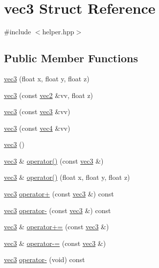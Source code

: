 \hypertarget{structvec3}{\section{vec3 Struct Reference}
\label{structvec3}
}


{\ttfamily \#include $<$helper.\+hpp$>$}

\subsection*{Public Member Functions}
\begin{DoxyCompactItemize}
\item 
\hyperlink{structvec3_a0c11a1f6ed4c349713657dd3452d6ea3}{vec3} (float x, float y, float z)
\item 
\hyperlink{structvec3_a0be4c6cdf0d0075143c7f002afbd9197}{vec3} (const \hyperlink{structvec2}{vec2} \&vv, float z)
\item 
\hyperlink{structvec3_ad4c53c507779713af6bc2f47d60b458e}{vec3} (const \hyperlink{structvec3}{vec3} \&vv)
\item 
\hyperlink{structvec3_ae8b2e6ef16b18f03756310a5ef9eb558}{vec3} (const \hyperlink{structvec4}{vec4} \&vv)
\item 
\hyperlink{structvec3_aea9f3480a6ccd7ce3ab02d0992705d33}{vec3} ()
\item 
\hyperlink{structvec3}{vec3} \& \hyperlink{structvec3_ae5c4f205385ed5c1497343ca91f34874}{operator()} (const \hyperlink{structvec3}{vec3} \&)
\item 
\hyperlink{structvec3}{vec3} \& \hyperlink{structvec3_adcc8c74d2a6bec1f2f8ce16779b511e1}{operator()} (float x, float y, float z)
\item 
\hyperlink{structvec3}{vec3} \hyperlink{structvec3_a3d8a20b779705b215e7cdcba780c8e70}{operator+} (const \hyperlink{structvec3}{vec3} \&) const 
\item 
\hyperlink{structvec3}{vec3} \hyperlink{structvec3_a3bd4baa92fdd2e08e0852eb1bbc80e58}{operator-\/} (const \hyperlink{structvec3}{vec3} \&) const 
\item 
\hyperlink{structvec3}{vec3} \& \hyperlink{structvec3_a35d8a4bfa8ea867ad4810674de7b43a4}{operator+=} (const \hyperlink{structvec3}{vec3} \&)
\item 
\hyperlink{structvec3}{vec3} \& \hyperlink{structvec3_a16a563beee180c1760a9c9cac25cecfc}{operator-\/=} (const \hyperlink{structvec3}{vec3} \&)
\item 
\hyperlink{structvec3}{vec3} \hyperlink{structvec3_ac0a865f4af52c9cb5f5dec837bccf0bd}{operator-\/} (void) const 

\end{DoxyCompactItemize}

